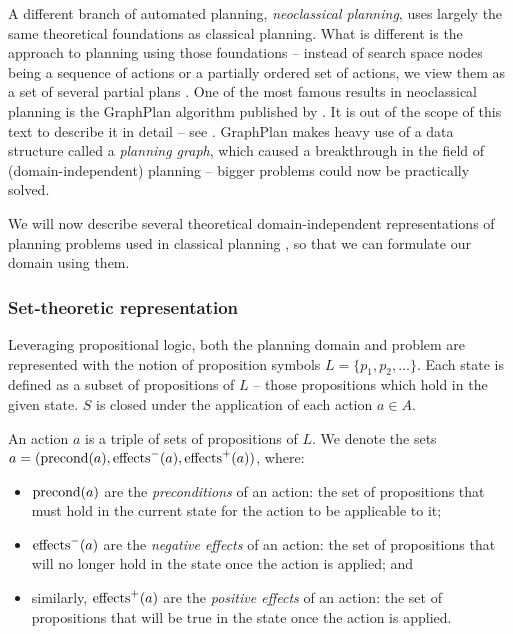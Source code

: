 A different branch of automated planning, \textit{neoclassical planning},
uses largely the same theoretical foundations as classical 
planning. What is different is the approach to planning using those foundations
-- instead of search space nodes being a sequence of actions or a partially ordered
set of actions, we view them as a set of several partial plans
\citep[Part~II]{Ghallab2004}.
One of the most famous results in neoclassical planning is the GraphPlan algorithm
published by \citet{Blum1997}. It is out of the scope of this text to describe it in detail
-- see \citet[Section~6.3]{Ghallab2004}.
GraphPlan makes heavy use of a data structure called a \textit{planning graph},
which caused a breakthrough in the field of (domain-independent) planning
-- bigger problems could now be practically solved.

We will now describe several theoretical domain-independent representations
of planning problems used in classical planning \citep[Chapter~2]{Ghallab2004},
so that we can formulate our domain using them.

\subsubsection{Set-theoretic representation}

Leveraging propositional logic, both the planning domain and problem
are represented with the notion
of proposition symbols $L = \{p_1, p_2, \ldots\}$.
Each state is defined as a subset of propositions of $L$ -- those propositions
which hold in the given state. $S$ is closed under the application of each
action $a \in A$.

An action $a$
is a triple of sets of propositions of $L$.
We denote the sets $a = (\operatorname{\textrm{precond}}(a), \operatorname{\textrm{effects}}^-(a), \operatorname{\textrm{effects}}^+(a))$, where:
\begin{itemize}
\item $\operatorname{\textrm{precond}}(a)$ are the \textit{preconditions} of an action: the set of
propositions that must hold in the current state for the action to be applicable to it;
\item $\operatorname{\textrm{effects}}^-(a)$ are the \textit{negative effects} of an action:
the set of propositions
that will no longer hold in the state once the action is applied; and
\item similarly, $\operatorname{\textrm{effects}}^+(a)$ are the \textit{positive effects} of an action:
the set of propositions that will be true in the state once the action is applied.
\end{itemize}

